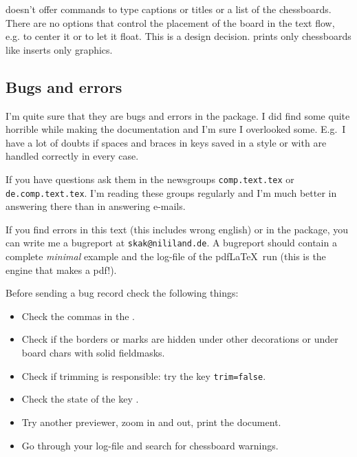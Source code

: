 \documentclass[pagesize,parskip=half-,fontsize=12pt]{scrartcl}
\begin{document}
 \Pchessboard doesn't offer commands to type
captions or titles or a list of the chessboards. There are no options
that control the placement of the board in the text flow, e.g. to
center it or to let it float. This is a design decision.
 prints only chessboards like 
inserts only graphics.



\subsection{Bugs and errors}

I'm quite sure that they are bugs and errors in the package. I did
find some quite horrible while making the documentation and I'm sure
I overlooked some. E.g.\ I have a lot of doubts if spaces and braces
in keys saved in a style or with  are handled
correctly in every case.

If you have questions ask them in the newsgroups
\nolinkurl{comp.text.tex} or
\nolinkurl{de.comp.text.tex}. I'm reading these groups regularly and
I'm much better in answering there than in answering e-mails.


If you find errors in this text  (this includes wrong english) or in
the package, you can write me a bugreport at
\nolinkurl{skak@nililand.de}. A bugreport should contain a complete \emph{minimal}
example and the log-file of the pdf\LaTeX\ run (this is the engine
that makes a pdf!).

Before sending a bug record check the following things:


\begin{itemize}
\item  Check the commas in the \keylists.
\end{itemize}

\begin{itemize}
\item Check if the borders or marks are hidden under other decorations or under board chars with solid fieldmasks.
\item Check if trimming is responsible: try the key \verb+trim=false+.
\item Check the state of the key .
\item Try another previewer, zoom in and out, print the document.
\item Go through your log-file and search for chessboard warnings.
\end{itemize}
\end{document}
